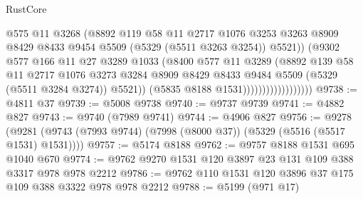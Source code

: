 \begin{lexlean}{RustCore}
\begin{coremodule}
                                      @575
                                      @11
                                      @3268
                                      (@8892
                                        @119
                                        @58
                                        @11
                                        @2717
                                        @1076
                                        @3253
                                        @3263
                                        @8909
                                        @8429
                                        @8433
                                        @9454
                                        @5509
                                        (@5329 (@5511 @3263 @3254))
                                        @5521))
                                    (@9302
                                      @577
                                      @166
                                      @11
                                      @27
                                      @3289
                                      @1033
                                      (@8400
                                        @577
                                        @11
                                        @3289
                                        (@8892
                                          @139
                                          @58
                                          @11
                                          @2717
                                          @1076
                                          @3273
                                          @3284
                                          @8909
                                          @8429
                                          @8433
                                          @9484
                                          @5509
                                          (@5329 (@5511 @3284 @3274))
                                          @5521))
                                      (@5835 @8188 @1531))))))))))))))))))
@9738 := @4811 @37
@9739 := @5008 @9738
@9740 := @9737 @9739
@9741 := @4882 @827
@9743 := @9740 (@7989 @9741)
@9744 := @4906 @827
@9756 := @9278 (@9281 (@9743 (@7993 @9744) (@7998 (@8000 @37)) (@5329 (@5516 (@5517 @1531) @1531))))
@9757 := @5174 @8188
@9762 := @9757 @8188 @1531 @695 @1040 @670
@9774 := @9762 @9270 @1531 @120 @3897 @23 @131 @109 @388 @3317 @978 @978 @2212
@9786 := @9762 @110 @1531 @120 @3896 @37 @175 @109 @388 @3322 @978 @978 @2212
@9788 := @5199 (@971 @17)

\end{coremodule}
\end{lexlean}
